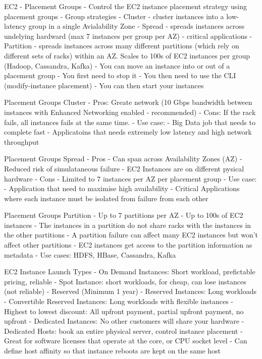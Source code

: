\documentclass[11pt]{book}
\begin{document}
    EC2 - Placement Groups
    - Control the EC2 instance placement strategy using placement groups
    - Group strategies
        - Cluster - cluster instances into a low-latency group in a single Avialability Zone
        - Spread - spreads instances across undelying hardward (max 7 instances per group per AZ) - critical applications
        - Partition - spreads instances across many different partitions (which rely on different sets of racks) within an AZ. Scales to 100s of EC2 instances per group (Hadoop, Cassandra, Kafka)
    - You can move an instance into or out of a placement group
        - You first need to stop it
        - You then need to use the CLI (modify-instance placement)
        - You can then start your instances

    Placement Groups Cluster
    - Pros: Greate network (10 Gbps bandwidth between instances with Enhanced Networking enabled - recommended)
    - Cons: If the rack fails, all instances fails at the same time.
    - Use case:
        - Big Data job that needs to complete fast
        - Applicatoins that needs extremely low latency and high network throughput

    Placement Groups Spread
    - Pros
        - Can span across Availability Zones (AZ)
        - Reduced risk of simulataneous failure
        - EC2 Instances are on different pysical hardware
    - Cons
        - Limited to 7 instances per AZ per placement group
    - Use case:
        - Application that need to maximise high availability
        - Critical Applications where each instance must be isolated from failure from each other

    Placement Groups Partition
    - Up to 7 partitions per AZ
    - Up to 100s of EC2 instances
    - The instances in a partition do not share racks with the instances in the other partitions
    - A partition failure can affect many EC2 instances but won't affect other partitions
    - EC2 instances get access to the partition information as metadata
    - Use cases: HDFS, HBase, Cassandra, Kafka

    EC2 Instance Launch Types
    - On Demand Instances: Short workload, prefictable pricing, reliable
    - Spot Instance: short workloads, for cheap, can lose instances (not reliable)
    - Reserved (Minimum 1 year)
        - Reserved Instances: Long workloads
        - Convertible Reserved Instances: Long workloads with flexible instances
        - Highest to lowest discount: All upfront payment, partial upfront payment, no upfront
    - Dedicated Instances: No other customers will share your hardware
    - Dedicated Hosts: book an entire physical server, control instance placement
        - Great for software licenses that operate at the core, or CPU socket level
        - Can define host affinity so that instance reboots are kept on the same host
\end{document}
